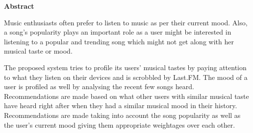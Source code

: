 \cleardoublepage

\begin{center}
	\huge{\textbf{Abstract}}
\end{center}

Music enthusiasts often prefer to listen to music as per their current mood. Also, a song's popularity plays an important role as a user might be interested in listening to a popular and trending song which might not get along with her musical taste or mood.

The proposed system tries to profile its users' musical tastes by paying attention to what they listen on their devices and is scrobbled by Last.FM. The mood of a user is profiled as well by analysing the recent few songs heard. Recommendations are made based on what other users with similar musical taste have heard right after when they had a similar musical mood in their history.  Recommendations are made taking into account the song popularity as well as the user's current mood giving them appropriate weightages over each other.